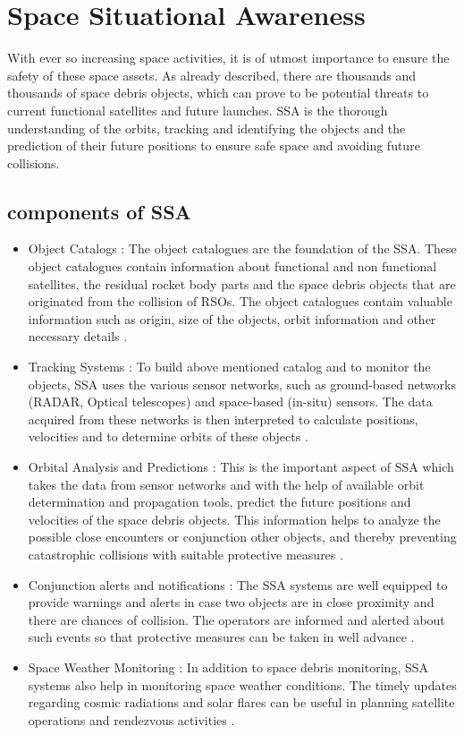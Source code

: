 \section{Space Situational Awareness}

With ever so increasing space activities, it is of utmost importance to ensure the safety of these space assets. As already described, there are thousands and thousands of
space debris objects, which can prove to be potential threats to current functional satellites and future launches. SSA is the thorough understanding
of the orbits, tracking and identifying the objects and the prediction of their future positions to ensure safe space and avoiding future collisions.





\subsection{components of SSA}
\begin{itemize}
  \item Object Catalogs : The object catalogues are the foundation of the SSA. These object catalogues contain information about functional and non functional satellites, the residual rocket body parts and the space debris objects that are originated from the collision of RSOs. The object catalogues contain valuable information such as origin, size of the objects, orbit information and other necessary details \cite{esa6}.
  \item Tracking Systems : To build above mentioned catalog and to monitor the objects, SSA uses the various sensor networks, such as ground-based networks (RADAR, Optical telescopes) and space-based (in-situ) sensors. The data acquired from these networks is then interpreted to calculate positions, velocities and to determine orbits of these objects \cite{esa6}.
  \item Orbital Analysis and Predictions : This is the important aspect of SSA which takes the data from sensor networks and with the help of available orbit determination and propagation tools, predict the future positions and velocities of the space debris objects. This information helps to analyze the possible close encounters or conjunction other objects, and thereby preventing catastrophic collisions with suitable protective measures \cite{esa6}.
  \item Conjunction alerts and notifications : The SSA systems are well equipped to provide warnings and alerts in case two objects are in close proximity and there are chances of collision. The operators are informed and alerted about such events so that protective measures can be taken in well advance \cite{esa6}.
  \item Space Weather Monitoring : In addition to space debris monitoring, SSA systems also help in monitoring space weather conditions. The timely updates regarding cosmic radiations and solar flares can be useful in planning satellite operations and rendezvous activities \cite{esa6}.
\end{itemize}

